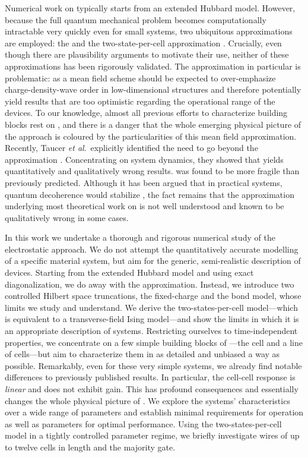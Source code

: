 Numerical work on  typically starts from an extended Hubbard model.
However, because the full quantum mechanical problem becomes computationally
intractable very quickly even for small systems, two ubiquitous approximations
are employed: the  and the two-state-per-cell approximation
\cite{lent1993quantum, tougaw1996dynamic}. Crucially, even though there
are plausibility arguments to motivate their use, neither of these
approximations has been rigorously validated. The  approximation in
particular is problematic: as a mean field scheme  should be expected
to over-emphasize charge-density-wave order in low-dimensional structures and
therefore potentially yield results that are too optimistic regarding the
operational range of the devices. To our knowledge, almost all previous efforts
to characterize  building blocks rest on , and there is a
danger that the whole emerging physical picture of the  approach is
coloured by the particularities of this mean field approximation. Recently,
Taucer \emph{et al}.~explicitly identified the need to go beyond the 
approximation \cite{taucer2012consequences}. Concentrating on system dynamics,
they showed that  yields quantitatively and qualitatively wrong
results.  was found to be more fragile than previously predicted.
Although it has been argued that in practical systems, quantum decoherence would
stabilize  \cite{blair2013environmental}, the fact remains that the
approximation underlying most theoretical work on  is not well
understood and known to be qualitatively wrong in some cases.

In this work we undertake a thorough and rigorous numerical study of the
electrostatic  approach. We do not attempt the quantitatively accurate
modelling of a specific material system, but aim for the generic, semi-realistic
description of  devices. Starting from the extended Hubbard model and
using exact diagonalization, we do away with the  approximation.
Instead, we introduce two controlled Hilbert space truncations, the fixed-charge
and the bond model, whose limits we study and understand. We derive the
two-states-per-cell model---which is equivalent to a transverse-field Ising
model---and show the limits in which it is an appropriate description of
 systems. Restricting ourselves to time-independent properties, we
concentrate on a few simple building blocks of ---the cell and a line
of cells---but aim to characterize them in as detailed and unbiased a way as
possible. Remarkably, even for these very simple  systems, we already
find notable differences to previously published results. In particular, the
cell-cell response is \emph{linear} and does not exhibit gain. This has profound
consequences and essentially changes the whole physical picture of .
We explore the systems' characteristics over a wide range of parameters and
establish minimal requirements for  operation as well as parameters
for optimal performance. Using the two-states-per-cell model in a tightly
controlled parameter regime, we briefly investigate wires of up to twelve cells
in length and the majority gate.

